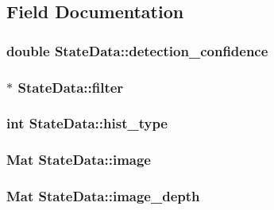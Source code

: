 \subsection{Field Documentation}
\hypertarget{classStateData_abe87d63070a9fc98cd9f1475495725e6}{
\subsubsection[{detection\_\-confidence}]{\setlength{\rightskip}{0pt plus 5cm}double {\bf StateData::detection\_\-confidence}}}
\label{classStateData_abe87d63070a9fc98cd9f1475495725e6}
\hypertarget{classStateData_a42c35fd351a6634b67fd1fd2f5a09cf4}{
\subsubsection[{filter}]{$\ast$ {\bf StateData::filter}}}
\label{classStateData_a42c35fd351a6634b67fd1fd2f5a09cf4}
\hypertarget{classStateData_a14b4b6d403b4517d7102f49a501d51ed}{
\subsubsection[{hist\_\-type}]{\setlength{\rightskip}{0pt plus 5cm}int {\bf StateData::hist\_\-type}}}
\label{classStateData_a14b4b6d403b4517d7102f49a501d51ed}
\hypertarget{classStateData_ab1a1e2be2b9a55c78bc579024d30cf64}{
\subsubsection[{image}]{\setlength{\rightskip}{0pt plus 5cm}Mat {\bf StateData::image}}}
\label{classStateData_ab1a1e2be2b9a55c78bc579024d30cf64}
\hypertarget{classStateData_a662c82a423f855845f2be8700af72817}{
\subsubsection[{image\_\-depth}]{\setlength{\rightskip}{0pt plus 5cm}Mat {\bf StateData::image\_\-depth}}}
